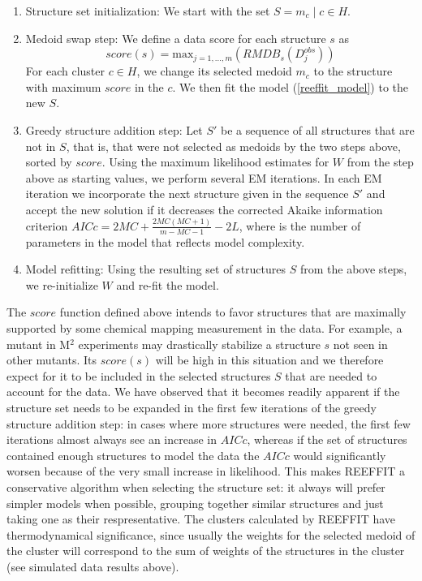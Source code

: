\documentclass[12pt]{article}
\begin{document}
\begin{enumerate}
\item Structure set initialization: We start with the set $S = {m_c \mid c \in H}$.
\item Medoid swap step: We define a data score for each structure $s$ as 
\[score(s) = \mbox{max}_{j = 1, ..., m}(RMDB_{s}(D^{obs}_{j}))\]
For each cluster $c \in H$, we change its selected medoid $m_c$ to the structure with maximum $score$ in the $c$. We then fit the model (\ref{reeffit_model}) to the new $S$.
\item Greedy structure addition step: Let $S'$ be a sequence of all structures that are not in $S$, that is, that were not selected as medoids by the two steps above, sorted by $score$. Using the maximum likelihood estimates for $W$ from the step above as starting values, we perform several EM iterations. In each EM iteration we incorporate the next structure given in the sequence $S'$ and accept the new solution if it decreases the corrected Akaike information criterion $AICc = 2MC +  \frac{2MC(MC+1)}{m-MC-1}  - 2L$, where is the number of parameters in the model that reflects model complexity.
\item Model refitting: Using the resulting set of structures $S$ from the above steps, we re-initialize $W$ and re-fit the model.
\end{enumerate}

The $score$ function defined above intends to favor structures that are maximally supported by some chemical mapping measurement in the data. For example, a mutant in M$^2$ experiments may drastically stabilize a structure $s$ not seen in other mutants. Its $score(s)$ will be high in this situation and we therefore expect for it to be included in the selected structures $S$ that are needed to account for the data. We have observed that it becomes readily apparent if the structure set needs to be expanded in the first few iterations of the greedy structure addition step: in cases where more structures were needed, the first few iterations almost always see an increase in $AICc$, whereas if the set of structures contained enough structures to model the data the $AICc$ would significantly worsen because of the very small increase in likelihood. This makes REEFFIT a conservative algorithm when selecting the structure set: it always will prefer simpler models when possible, grouping together similar structures and just taking one as their respresentative. The clusters calculated by REEFFIT have thermodynamical significance, since usually the weights for the selected medoid of the cluster will correspond to the sum of weights of the structures in the cluster (see simulated data results above).
\end{document}
